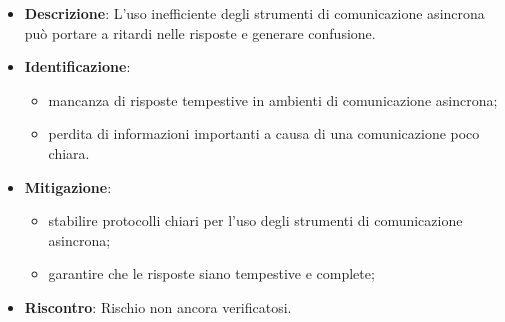 \label{risk:comunicazione asincrona inefficace}
\begin{itemize}
	\item \textbf{Descrizione}:
			L'uso inefficiente degli strumenti di comunicazione asincrona 
			può portare a ritardi nelle risposte e generare confusione.

	\item \textbf{Identificazione}:
	      \begin{itemize}
		      \item mancanza di risposte tempestive in ambienti di comunicazione asincrona;

		      \item perdita di informazioni importanti a causa di una comunicazione poco chiara.
	      \end{itemize}

	\item \textbf{Mitigazione}:
	      \begin{itemize}
		      \item stabilire protocolli chiari per l'uso degli strumenti di comunicazione asincrona;

		      \item garantire che le risposte siano tempestive e complete;
	      \end{itemize}
	\item \textbf{Riscontro}: Rischio non ancora verificatosi.
\end{itemize}
